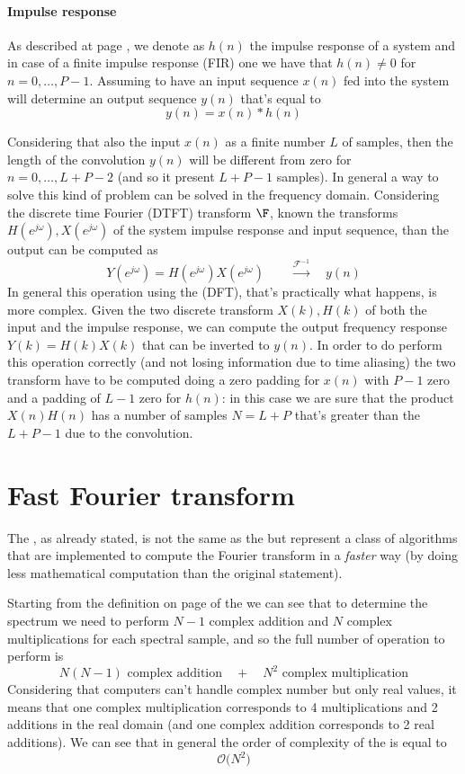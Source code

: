 	\paragraph{Impulse response} As described at page \pageref{sec:impulseresponse}, we denote as $h(n)$ the impulse response of a system and in case of a finite impulse response (FIR) one we have that $h(n) \neq 0$ for $n=0,\dots,P-1$. Assuming to have an input sequence $x(n)$ fed into the system will determine an output sequence $y(n)$ that's equal to
	\[ y(n) = x(n) * h(n) \] 
	
	Considering that also the input $x(n)$ as a finite number $L$ of samples, then the length of the convolution $y(n)$ will be different from zero for $n=0,\dots, L+P-2$ (and so it present $L+P-1$ samples). In general a way to solve this kind of problem can be solved in the frequency domain. Considering the discrete time Fourier (DTFT) transform $\F$, known the transforms $H(e^{j\omega}), X(e^{j\omega})$ of the system impulse response and input sequence, than the output can be computed as
	\[ Y(e^{j\omega}) = H(e^{j\omega}) X(e^{j\omega}) \qquad \xrightarrow{\mathscr{F}^{-1}} \quad y(n) \]
	In general this operation using the \dft (DFT), that's practically what happens, is more complex. Given the two discrete transform $X(k),H(k)$ of both the input and the impulse response, we can compute the output frequency response $Y(k) = H(k) X(k)$ that can be inverted to $y(n)$. In order to do perform this operation correctly (and not losing information due to time aliasing) the two transform have to be computed doing a zero padding for $x(n)$ with $P-1$ zero and a padding of $L-1$ zero for $h(n)$: in this case we are sure that the product $X(n)H(n)$ has a number of samples $N = L+P$ that's greater than the $L+P-1$ due to the convolution.

\section{Fast Fourier transform}
	The \de{\fft}, as already stated, is not the same as the \dft but represent a class of algorithms that are implemented to compute the Fourier transform in a \textit{faster} way (by doing less mathematical computation than the original statement).
	
	Starting from the definition on page \pageref{eq:ft:dft} of the \dft we can see that to determine the spectrum we need to perform $N-1$ complex addition and $N$ complex multiplications for each spectral sample, and so the full number of operation to perform is
	\[ N(N-1) \textrm{ complex addition} \quad + \quad N^2 \textrm{ complex multiplication} \]
	Considering that computers can't handle complex number but only real values, it means that one complex multiplication corresponds to 4 multiplications and 2 additions in the real domain (and one complex addition corresponds to 2 real additions). We can see that in general the order of complexity of the \dft is equal to
	\[ \mathcal O \big(N^2\big)\]
	
